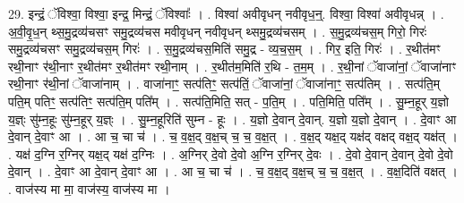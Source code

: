 \documentclass[17pt]{extarticle}
\begin{document}
29. इन्द्रं॒ ॅविश्वा॒ विश्वा॒ इन्द्र॒ मिन्द्रं॒ ॅविश्वाः᳚ । . विश्वा॑ अवीवृधन् नवीवृध॒न्॒. विश्वा॒ विश्वा॑ अवीवृधन्न् । . अ॒वी॒वृ॒ध॒न् थ्स॒मु॒द्रव्य॑चसꣳ समु॒द्रव्य॑चस मवीवृधन् नवीवृधन् थ्समु॒द्रव्य॑चसम् । . स॒मु॒द्रव्य॑चस॒म् गिरो॒ गिरः॑ समु॒द्रव्य॑चसꣳ समु॒द्रव्य॑चस॒म् गिरः॑ । . स॒मु॒द्रव्य॑चस॒मिति॑ समु॒द्र - व्य॒च॒स॒म् । . गिर॒ इति॒ गिरः॑ । . र॒थीत॑मꣳ रथी॒नाꣳ र॑थी॒नाꣳ र॒थीत॑मꣳ र॒थीत॑मꣳ रथी॒नाम् । . र॒थीत॑म॒मिति॑ र॒थि - त॒म॒म् । . र॒थी॒नां ॅवाजा॑नां॒ ॅवाजा॑नाꣳ रथी॒नाꣳ र॑थी॒नां ॅवाजा॑नाम् । . वाजा॑नाꣳ॒॒ सत्प॑तिꣳ॒॒ सत्प॑तिं॒ ॅवाजा॑नां॒ ॅवाजा॑नाꣳ॒॒ सत्प॑तिम् । . सत्प॑ति॒म् पति॒म् पतिꣳ॒॒ सत्प॑तिꣳ॒॒ सत्प॑ति॒म् पति᳚म् । . सत्प॑ति॒मिति॒ सत् - प॒ति॒म् । . पति॒मिति॒ पति᳚म् । . सु॒म्न॒हूर् य॒ज्ञो य॒ज्ञ्ः सु॑म्न॒हूः सु॑म्न॒हूर् य॒ज्ञ्ः । . सु॒म्न॒हूरिति॑ सुम्न - हूः । . य॒ज्ञो दे॒वान् दे॒वान्. य॒ज्ञो य॒ज्ञो दे॒वान् । . दे॒वाꣳ आ दे॒वान् दे॒वाꣳ आ । . आ च॒ चा च॑ । . च॒ व॒क्ष॒द् व॒क्ष॒च् च॒ च॒ व॒क्ष॒त् । . व॒क्ष॒द् यक्ष॒द् यक्ष॑द् वक्षद् वक्ष॒द् यक्ष॑त् । . यक्ष॑ द॒ग्नि र॒ग्निर् यक्ष॒द् यक्ष॑ द॒ग्निः । . अ॒ग्निर् दे॒वो दे॒वो अ॒ग्नि र॒ग्निर् दे॒वः । . दे॒वो दे॒वान् दे॒वान् दे॒वो दे॒वो दे॒वान् । . दे॒वाꣳ आ दे॒वान् दे॒वाꣳ आ । . आ च॒ चा च॑ । . च॒ व॒क्ष॒द् व॒क्ष॒च् च॒ च॒ व॒क्ष॒त् । . व॒क्ष॒दिति॑ वक्षत् । . वाज॑स्य मा मा॒ वाज॑स्य॒ वाज॑स्य मा । \newline
\end{document}
